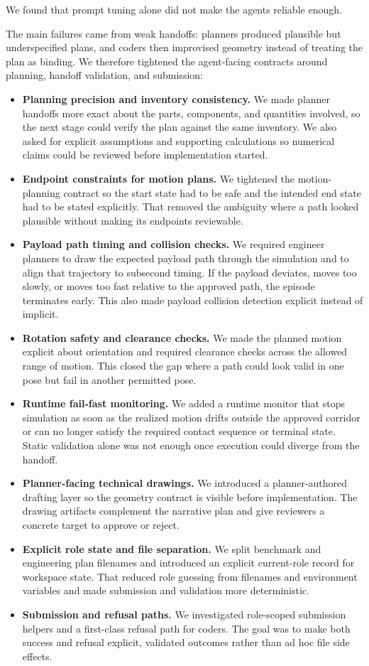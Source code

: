 \documentclass[conference]{IEEEtran}
\begin{document}
We found that prompt tuning alone did not make the agents reliable enough.

The main failures came from weak handoffs: planners produced plausible but underspecified plans, and coders then improvised geometry instead of treating the plan as binding. We therefore tightened the agent-facing contracts around planning, handoff validation, and submission:
\begin{itemize}
    \item \textbf{Planning precision and inventory consistency.} We made planner handoffs more exact about the parts, components, and quantities involved, so the next stage could verify the plan against the same inventory. We also asked for explicit assumptions and supporting calculations so numerical claims could be reviewed before implementation started.
    \item \textbf{Endpoint constraints for motion plans.} We tightened the motion-planning contract so the start state had to be safe and the intended end state had to be stated explicitly. That removed the ambiguity where a path looked plausible without making its endpoints reviewable.
    \item \textbf{Payload path timing and collision checks.} We required engineer planners to draw the expected payload path through the simulation and to align that trajectory to subsecond timing. If the payload deviates, moves too slowly, or moves too fast relative to the approved path, the episode terminates early. This also made payload collision detection explicit instead of implicit.
    \item \textbf{Rotation safety and clearance checks.} We made the planned motion explicit about orientation and required clearance checks across the allowed range of motion. This closed the gap where a path could look valid in one pose but fail in another permitted pose.
    \item \textbf{Runtime fail-fast monitoring.} We added a runtime monitor that stops simulation as soon as the realized motion drifts outside the approved corridor or can no longer satisfy the required contact sequence or terminal state. Static validation alone was not enough once execution could diverge from the handoff.
    \item \textbf{Planner-facing technical drawings.} We introduced a planner-authored drafting layer so the geometry contract is visible before implementation. The drawing artifacts complement the narrative plan and give reviewers a concrete target to approve or reject.
    \item \textbf{Explicit role state and file separation.} We split benchmark and engineering plan filenames and introduced an explicit current-role record for workspace state. That reduced role guessing from filenames and environment variables and made submission and validation more deterministic.
    \item \textbf{Submission and refusal paths.} We investigated role-scoped submission helpers and a first-class refusal path for coders. The goal was to make both success and refusal explicit, validated outcomes rather than ad hoc file side effects.
\end{itemize}
\end{document}
